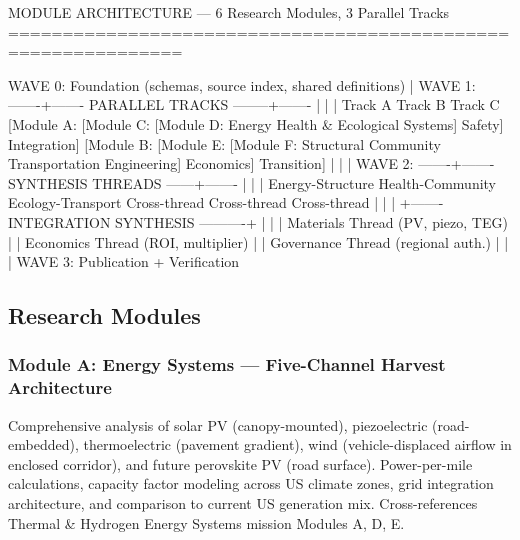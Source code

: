 \documentclass[11pt,letterpaper]{article}
\begin{document}
\begin{asciibox}
    MODULE ARCHITECTURE --- 6 Research Modules, 3 Parallel Tracks
    ==============================================================

    WAVE 0: Foundation (schemas, source index, shared definitions)
            |
    WAVE 1: -------+------- PARALLEL TRACKS --------+-------
            |                |                       |
         Track A          Track B                 Track C
      [Module A:        [Module C:              [Module D:
       Energy            Health &                Ecological
       Systems]          Safety]                 Integration]
      [Module B:        [Module E:              [Module F:
       Structural        Community               Transportation
       Engineering]      Economics]              Transition]
            |                |                       |
    WAVE 2: -------+------- SYNTHESIS THREADS ------+-------
            |                |                       |
      Energy-Structure   Health-Community        Ecology-Transport
      Cross-thread       Cross-thread            Cross-thread
            |                |                       |
            +------- INTEGRATION SYNTHESIS ----------+
            |                                        |
            |    Materials Thread (PV, piezo, TEG)    |
            |    Economics Thread (ROI, multiplier)   |
            |    Governance Thread (regional auth.)   |
            |                                        |
    WAVE 3: Publication + Verification
\end{asciibox}

\subsection{Research Modules}

\subsubsection{Module A: Energy Systems --- Five-Channel Harvest Architecture}
Comprehensive analysis of solar PV (canopy-mounted), piezoelectric (road-embedded), thermoelectric (pavement gradient), wind (vehicle-displaced airflow in enclosed corridor), and future perovskite PV (road surface). Power-per-mile calculations, capacity factor modeling across US climate zones, grid integration architecture, and comparison to current US generation mix. Cross-references Thermal \& Hydrogen Energy Systems mission Modules A, D, E.
\end{document}
